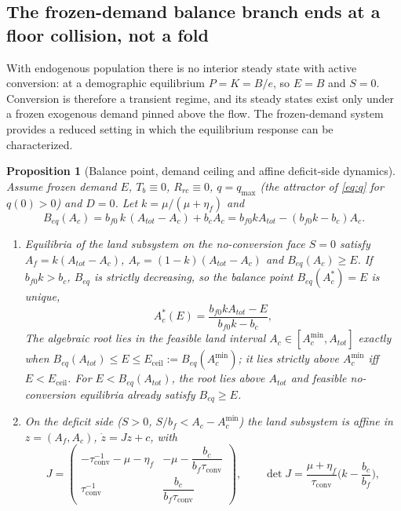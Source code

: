 \documentclass[preprint,12pt,authoryear]{elsarticle}
\newtheorem{proposition}{Proposition}
\newcommand{\Eceil}{E_{\mathrm{ceil}}}
\newcommand{\Acmin}{A_c^{\min}}
\newcommand{\tconv}{\tau_{\mathrm{conv}}}
\begin{document}
\subsection{The frozen-demand balance branch ends at a floor collision, not a fold}\label{sec:ceiling}

With endogenous population there is no interior steady state with active conversion: at a demographic equilibrium $P=K=B/e$, so $E=B$ and $S=0$. Conversion is therefore a transient regime, and its steady states exist only under a frozen exogenous demand pinned above the flow. The frozen-demand system provides a reduced setting in which the equilibrium response can be characterized.

\begin{proposition}[Balance point, demand ceiling and affine deficit-side dynamics]\label{prop:ceiling}
Assume frozen demand $E$, $T_b\equiv0$, $R_{rc}\equiv0$, $q=q_{\max}$ (the attractor of \eqref{eq:q} for $q(0)>0$) and $D=0$. Let $k=\mu/(\mu+\eta_f)$ and
\begin{equation}\label{eq:Beq}
B_{eq}(A_c)=b_{f0}\,k\,(A_{tot}-A_c)+b_cA_c=b_{f0}kA_{tot}-(b_{f0}k-b_c)A_c .
\end{equation}
\begin{enumerate}[label=(\roman*)]
\item Equilibria of the land subsystem on the no-conversion face $S=0$ satisfy $A_f=k(A_{tot}-A_c)$, $A_r=(1-k)(A_{tot}-A_c)$ and $B_{eq}(A_c)\ge E$. If $b_{f0}k>b_c$, $B_{eq}$ is strictly decreasing, so the balance point $B_{eq}(A_c^*)=E$ is unique,
\begin{equation}\label{eq:Acstar}
A_c^*(E)=\frac{b_{f0}kA_{tot}-E}{b_{f0}k-b_c},
\end{equation}
The algebraic root lies in the feasible land interval $A_c\in[\Acmin,A_{tot}]$ exactly when $B_{eq}(A_{tot})\le E\le\Eceil:=B_{eq}(\Acmin)$; it lies strictly above $\Acmin$ iff $E<\Eceil$. For $E<B_{eq}(A_{tot})$, the root lies above $A_{tot}$ and feasible no-conversion equilibria already satisfy $B_{eq}\ge E$.
\item On the deficit side ($S>0$, $S/b_f<A_c-\Acmin$) the land subsystem is affine in $z=(A_f,A_c)$, $\dot z=Jz+c$, with
\begin{equation}\label{eq:J}
J=\begin{pmatrix}-\tconv^{-1}-\mu-\eta_f & -\mu-\dfrac{b_c}{b_f\tconv}\\[8pt] \tconv^{-1} & \dfrac{b_c}{b_f\tconv}\end{pmatrix},
\qquad \det J=\frac{\mu+\eta_f}{\tconv}\Big(k-\frac{b_c}{b_f}\Big),

\end{equation}
\end{enumerate}
\end{proposition}
\end{document}
